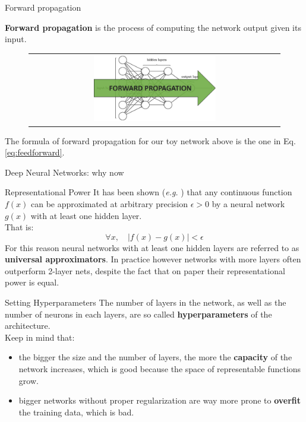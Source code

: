 \documentclass[aspectratio=169]{beamer}
\begin{document}
\begin{frame}{Forward propagation}

\textbf{Forward propagation} is the process of computing the network output given its input.
\begin{figure}
\begin{tabular}{c}
\includegraphics[width=0.5\textwidth]{img/dnn/forward_prop.jpg}
\end{tabular}
\end{figure}
The formula of forward propagation for our toy network above is the one in Eq. \ref{eq:feedforward}.

\end{frame}

\begin{frame}{Deep Neural Networks: why now}
\end{frame}


\begin{frame}{Representational Power}
It has been shown (\emph{e.g.} \cite{cybenko1989approximation}) that any continuous function $f(x)$ can be approximated at arbitrary precision $\epsilon > 0$ by a neural network $g(x)$ with at least one hidden layer.\\
That is:
\begin{equation*}
\forall x, \quad |f(x) - g(x)| < \epsilon
\end{equation*}
For this reason neural networks with at least one hidden layers are referred to as \textbf{universal approximators}.
In practice however networks with more layers often outperform 2-layer nets, despite the fact that on paper their representational power is equal.
\end{frame}


\begin{frame}{Setting Hyperparameters}
The number of layers in the network, as well as the number of neurons in each layers, are so called \textbf{hyperparameters} of the architecture.\\
\vspace{0.25cm}
Keep in mind that:
\begin{itemize}
\item the bigger the size and the number of layers, the more the \textbf{capacity} of the network increases, which is good because the space of representable functions grow.\\
\item bigger networks without proper regularization are way more prone to \textbf{overfit} the training data, which is bad.
\end{itemize}

\end{frame}
\end{document}
